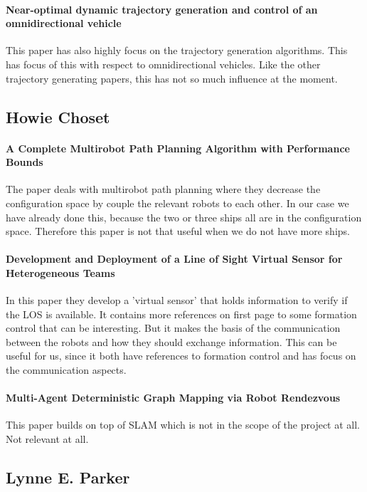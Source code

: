\paragraph{Near-optimal dynamic trajectory generation and control of an omnidirectional vehicle}
This paper has also highly focus on the trajectory generation algorithms. This has focus of this with respect to omnidirectional vehicles.
Like the other trajectory generating papers, this has not so much influence at the moment.


\subsection{Howie Choset}

\paragraph{A Complete Multirobot Path Planning Algorithm with Performance Bounds}
The paper deals with multirobot path planning where they decrease the configuration space by couple the relevant robots to each other. In our case we have already done this, because the two or three ships all are in the configuration space.
Therefore this paper is not that useful when we do not have more ships.

\paragraph{Development and Deployment of a Line of Sight Virtual Sensor for Heterogeneous Teams }
In this paper they develop a 'virtual sensor' that holds information to verify if the LOS is available. It contains more references on first page to some formation control that can be interesting. But it makes the basis of the communication between the robots and how they should exchange information.
This can be useful for us, since it both have references to formation control and has focus on the communication aspects.

\paragraph{Multi-Agent Deterministic Graph Mapping via Robot Rendezvous }
This paper builds on top of SLAM which is not in the scope of the project at all.
Not relevant at all.


\subsection{Lynne E. Parker}

